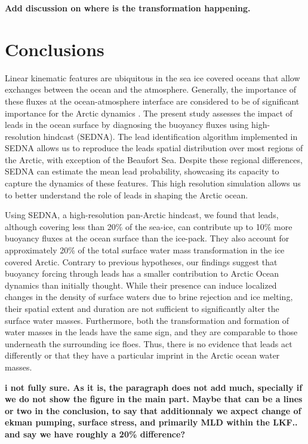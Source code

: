 \documentclass[draft]{agujournal2019}
\begin{document}
\textbf{Add discussion on where is the transformation happening.}

\section{Conclusions}

Linear kinematic features are ubiquitous in the sea ice covered oceans that allow exchanges between the ocean and the atmosphere. Generally, the importance of these fluxes at the ocean-atmosphere interface are considered to be of significant importance for the Arctic dynamics \citep{Maykut_solar_1995}. The present study assesses the impact of leads in the ocean surface by diagnosing the buoyancy fluxes using high-resolution hindcast (SEDNA). The lead identification algorithm implemented in SEDNA allows us to reproduce the leads spatial distribution over most regions of the Arctic, with exception of the Beaufort Sea. Despite these regional differences, SEDNA can estimate the mean lead probability, showcasing its capacity to capture the dynamics of these features. This high resolution simulation allows us to better understand the role of leads in shaping the Arctic ocean.

Using SEDNA, a high-resolution pan-Arctic hindcast, we found that leads, although covering less than 20\% of the sea-ice, can contribute up to 10\% more buoyancy fluxes at the ocean surface than the ice-pack. They also account for approximately 20\% of the total surface water mass transformation in the ice covered Arctic. Contrary to previous hypotheses, our findings suggest that buoyancy forcing through leads has a smaller contribution to Arctic Ocean dynamics than initially thought. While their presence can induce localized changes in the density of surface waters due to brine rejection and ice melting, their spatial extent and duration are not sufficient to significantly alter the surface water masses. Furthermore, both the transformation and formation of water masses in the leads have the same sign, and they are comparable to those underneath the surrounding ice floes. Thus, there is no evidence that leads act differently or that they have a particular imprint in the Arctic ocean water masses.

\textbf{i not fully sure. As it is, the paragraph does not add much, specially if we do not show the figure in the main part. Maybe that can be a lines or two in the conclusion, to say that additionnaly we axpect change of ekman pumping, surface stress, and primarily MLD within the LKF.. and say we have roughly a 20\% difference?}
\end{document}
